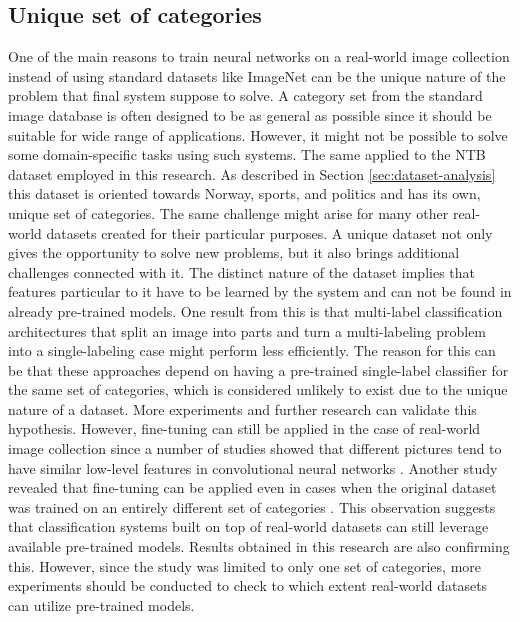 \subsection{Unique set of categories}
One of the main reasons to train neural networks on a real-world image collection instead of using standard datasets like ImageNet can be the unique nature of the problem that final system suppose to solve. A category set from the standard image database is often designed to be as general as possible since it should be suitable for wide range of applications. However, it might not be possible to solve some domain-specific tasks using such systems. The same applied to the NTB dataset employed in this research. As described in Section \ref{sec:dataset-analysis} this dataset is oriented towards Norway, sports, and politics and has its own, unique set of categories. The same challenge might arise for many other real-world datasets created for their particular purposes. A unique dataset not only gives the opportunity to solve new problems, but it also brings additional challenges connected with it. The distinct nature of the dataset implies that features particular to it have to be learned by the system and can not be found in already pre-trained models. One result from this is that multi-label classification architectures that split an image into parts and turn a multi-labeling problem into a single-labeling case might perform less efficiently. The reason for this can be that these approaches depend on having a pre-trained single-label classifier for the same set of categories, which is considered unlikely to exist due to the unique nature of a dataset. More experiments and further research can validate this hypothesis. However, fine-tuning can still be applied in the case of real-world image collection since a number of studies showed that different pictures tend to have similar low-level features in convolutional neural networks \cite{Pan2010TransferLearningSurvey, Oquab2014TransferringMidLevel}. Another study revealed that fine-tuning can be applied even in cases when the original dataset was trained on an entirely different set of categories \cite{Yosinski2014HowTransferable}. This observation suggests that classification systems built on top of real-world datasets can still leverage available pre-trained models. Results obtained in this research are also confirming this. However, since the study was limited to only one set of categories, more experiments should be conducted to check to which extent real-world datasets can utilize pre-trained models. 

